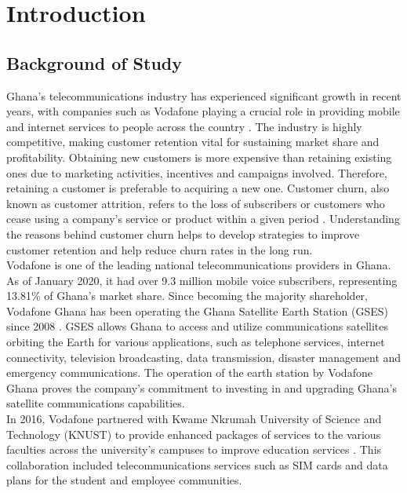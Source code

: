\documentclass[doublespacing,12pt]{report}
\begin{document}
\newpage
\listoftables



 




\newpage
\chapter{Introduction}


\section{Background of Study}

Ghana's telecommunications industry has experienced significant growth in recent years, with companies such as Vodafone playing a crucial role in providing mobile and internet services to people across the country \cite{bandim2022}. The industry is highly competitive, making customer retention vital for sustaining market share and profitability. Obtaining new customers is more expensive than retaining existing ones due to marketing activities, incentives and campaigns involved. Therefore, retaining a customer is preferable to acquiring a new one. Customer churn, also known as customer attrition, refers to the loss of subscribers or customers who cease using a company’s service or product within a given period \cite{Koranchirath2024}. Understanding the reasons behind customer churn helps to develop strategies to improve customer retention and help reduce churn rates in the long run.\\
Vodafone is one of the leading national telecommunications providers in Ghana. As of January 2020, it had over 9.3 million mobile voice subscribers, representing 13.81\% of Ghana's market share. Since becoming the majority shareholder, Vodafone Ghana has been operating the Ghana Satellite Earth Station (GSES) since 2008 \cite{vodafone_ghana}. GSES allows Ghana to access and utilize communications satellites orbiting the Earth for various applications, such as telephone services, internet connectivity, television broadcasting, data transmission, disaster management and emergency communications. The operation of the earth station by Vodafone Ghana proves the company's commitment to investing in and upgrading Ghana's satellite communications capabilities.\\
In 2016, Vodafone partnered with Kwame Nkrumah University of Science and Technology (KNUST) to provide enhanced packages of services to the various faculties across the university's campuses to improve education services \cite{vodafone_knust}. This collaboration included telecommunications services such as SIM cards and data plans for the student and employee communities.\\
\end{document}
